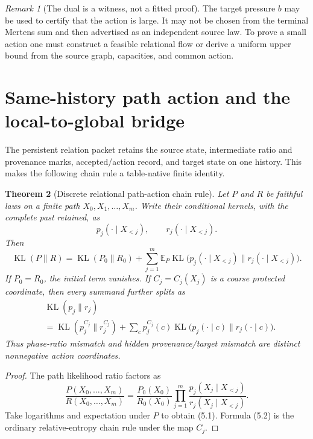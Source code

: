 \documentclass[11pt]{article}
\newtheorem{theorem}{Theorem}[section]
\theoremstyle{definition}
\theoremstyle{remark}
\newtheorem{remark}[theorem]{Remark}
\newcommand{\E}{\mathbb E}
\newcommand{\KL}{\operatorname{KL}}
\begin{document}
\begin{remark}[The dual is a witness, not a fitted proof]
The target pressure $b$ may be used to certify that the action is large.  It
may not be chosen from the terminal Mertens sum and then advertised as an
independent source law.  To prove a small action one must construct a feasible
relational flow or derive a uniform upper bound from the source graph,
capacities, and common action.
\end{remark}

\section{Same-history path action and the local-to-global bridge}
\label{sec:path-action}

The persistent relation packet retains the source state, intermediate ratio
and provenance marks, accepted/action record, and target state on one history.
This makes the following chain rule a table-native finite identity.

\begin{theorem}[Discrete relational path-action chain rule]
\label{thm:path-chain-rule}
Let $P$ and $R$ be faithful laws on a finite path
$X_0,X_1,\ldots,X_m$.  Write their conditional kernels, with the complete past
retained, as
\[
 p_j(\cdot\mid X_{<j}),
 \qquad
 r_j(\cdot\mid X_{<j}).
\]
Then
\[
 \boxed{
 \KL(P\|R)
 =\KL(P_0\|R_0)
  +\sum_{j=1}^m
   \E_P\KL\bigl(
    p_j(\cdot\mid X_{<j})
    \|r_j(\cdot\mid X_{<j})
   \bigr).}
 \tag{5.1}
\]
If $P_0=R_0$, the initial term vanishes.  If
$C_j=C_j(X_j)$ is a coarse protected coordinate, then every summand further
splits as
\[
 \boxed{
 \begin{aligned}
 &\KL(p_j\|r_j)\\
 &=\KL(p_j^{C_j}\|r_j^{C_j})
  +\sum_c p_j^{C_j}(c)
    \KL\bigl(p_j(\cdot\mid c)\|r_j(\cdot\mid c)\bigr).
 \end{aligned}}
 \tag{5.2}
\]
Thus phase-ratio mismatch and hidden provenance/target mismatch are distinct
nonnegative action coordinates.
\end{theorem}

\begin{proof}
The path likelihood ratio factors as
\[
 \frac{P(X_0,\ldots,X_m)}{R(X_0,\ldots,X_m)}
 =\frac{P_0(X_0)}{R_0(X_0)}
  \prod_{j=1}^m
  \frac{p_j(X_j\mid X_{<j})}{r_j(X_j\mid X_{<j})}.
\]
Take logarithms and expectation under $P$ to obtain \textup{(5.1)}.  Formula
\textup{(5.2)} is the ordinary relative-entropy chain rule under the map
$C_j$.
\end{proof}
\end{document}

